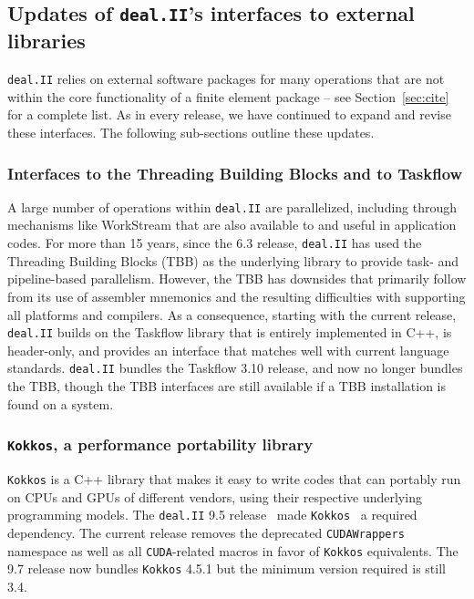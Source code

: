 \documentclass{ansarticle-preprint}
\newcommand{\specialword}[1]{\texttt{#1}}
\newcommand{\dealii}{{\specialword{deal.II}}\xspace}
\newcommand{\kokkos}{{\specialword{Kokkos}}\xspace}
\begin{document}
\subsection{Updates of \dealii{}'s interfaces to external libraries}
\label{subsec:external}

\dealii{} relies on external software packages for many operations
that are not within the core functionality of a finite element package
-- see Section~\ref{sec:cite} for a complete list. As in every
release, we have continued to expand and revise these interfaces. The
following sub-sections outline these updates.

\subsubsection{Interfaces to the Threading Building Blocks and to
  Taskflow}

A large number of operations within \dealii{} are parallelized,
including through mechanisms like WorkStream \cite{TKB16} that are
also available to and useful in application codes. For more than
15 years, since the 6.3 release, \dealii{} has used the Threading
Building Blocks (TBB) \cite{reinders2007tbb} as the underlying library to
provide task- and pipeline-based parallelism. However, the TBB has
downsides that primarily follow from its use of assembler mnemonics
and the resulting difficulties with supporting all platforms and
compilers. As a consequence, starting with the current release,
\dealii{} builds on the Taskflow library \cite{huang2021taskflow} that
is entirely implemented in C++, is header-only, and provides an
interface that matches well with current language standards. \dealii{}
bundles the Taskflow 3.10 release, and now no longer bundles the TBB,
though the TBB interfaces are still available if a TBB installation
is found on a system.



\subsubsection{\kokkos, a performance portability library}
\label{subsec:external-kokkos}

\kokkos is a C++ library that makes it easy to write codes that can
portably run on CPUs and GPUs of different vendors, using their
respective underlying programming models.
The \dealii{} 9.5 release~\cite{dealII95} made \kokkos~\cite{trott2022} a required
dependency. The current release removes the deprecated \texttt{CUDAWrappers} namespace as well
as all \texttt{CUDA}-related macros in favor of \kokkos
equivalents. The 9.7 release now bundles \kokkos 4.5.1 but the minimum version required is still 3.4.
\end{document}
